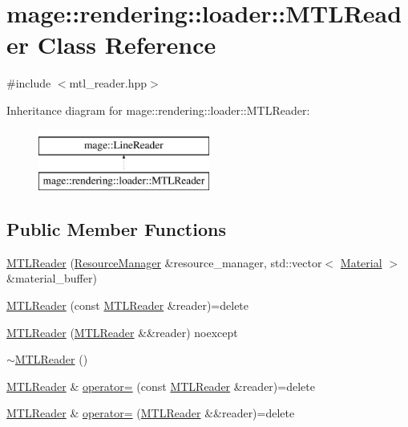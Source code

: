 \hypertarget{classmage_1_1rendering_1_1loader_1_1_m_t_l_reader}{}\section{mage\+:\+:rendering\+:\+:loader\+:\+:M\+T\+L\+Reader Class Reference}
\label{classmage_1_1rendering_1_1loader_1_1_m_t_l_reader}


{\ttfamily \#include $<$mtl\+\_\+reader.\+hpp$>$}

Inheritance diagram for mage\+:\+:rendering\+:\+:loader\+:\+:M\+T\+L\+Reader\+:\begin{figure}[H]
\begin{center}
\leavevmode
\includegraphics[height=2.000000cm]{classmage_1_1rendering_1_1loader_1_1_m_t_l_reader}
\end{center}
\end{figure}
\subsection*{Public Member Functions}
\begin{DoxyCompactItemize}
\item 
\hyperlink{classmage_1_1rendering_1_1loader_1_1_m_t_l_reader_a3615f6899de22b53de1bad257ac34099}{M\+T\+L\+Reader} (\hyperlink{classmage_1_1rendering_1_1_resource_manager}{Resource\+Manager} \&resource\+\_\+manager, std\+::vector$<$ \hyperlink{classmage_1_1rendering_1_1_material}{Material} $>$ \&material\+\_\+buffer)
\item 
\hyperlink{classmage_1_1rendering_1_1loader_1_1_m_t_l_reader_ad359e191af9b96e78660ed7aa313a48a}{M\+T\+L\+Reader} (const \hyperlink{classmage_1_1rendering_1_1loader_1_1_m_t_l_reader}{M\+T\+L\+Reader} \&reader)=delete
\item 
\hyperlink{classmage_1_1rendering_1_1loader_1_1_m_t_l_reader_af6b1842f18fb4a6e6bae435fd0f08496}{M\+T\+L\+Reader} (\hyperlink{classmage_1_1rendering_1_1loader_1_1_m_t_l_reader}{M\+T\+L\+Reader} \&\&reader) noexcept
\item 
\hyperlink{classmage_1_1rendering_1_1loader_1_1_m_t_l_reader_a87a4f9bf27cfe8e7e7d0c13c330775d6}{$\sim$\+M\+T\+L\+Reader} ()
\item 
\hyperlink{classmage_1_1rendering_1_1loader_1_1_m_t_l_reader}{M\+T\+L\+Reader} \& \hyperlink{classmage_1_1rendering_1_1loader_1_1_m_t_l_reader_a1153606ce103d9f667726cf5f66a88d1}{operator=} (const \hyperlink{classmage_1_1rendering_1_1loader_1_1_m_t_l_reader}{M\+T\+L\+Reader} \&reader)=delete
\item 
\hyperlink{classmage_1_1rendering_1_1loader_1_1_m_t_l_reader}{M\+T\+L\+Reader} \& \hyperlink{classmage_1_1rendering_1_1loader_1_1_m_t_l_reader_a057f38f1f720e040b2ab5fa08f42fac4}{operator=} (\hyperlink{classmage_1_1rendering_1_1loader_1_1_m_t_l_reader}{M\+T\+L\+Reader} \&\&reader)=delete
\end{DoxyCompactItemize}
